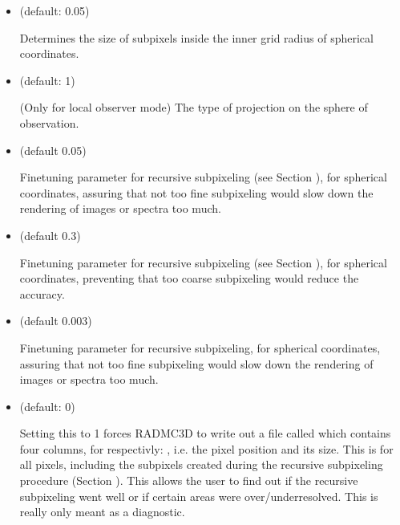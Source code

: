 \documentclass[letterpaper,10pt,english]{sphinxmanual}
\begin{document}
\begin{itemize}
\item {} 
 (default: 0.05) 

Determines the size of sub\sphinxhyphen{}pixels inside the inner grid radius of
spherical coordinates.

\item {} 
 (default: 1)

(Only for local observer mode) The type of projection on the sphere of
observation.

\item {} 
 (default 0.05) 

Fine\sphinxhyphen{}tuning parameter for recursive subpixeling (see Section
{\hyperref[\detokenize{imagesspectra:sec-recursive-subpixeling}]{}}), for spherical coordinates,
assuring that not too fine subpixeling would slow down the rendering of
images or spectra too much.

\item {} 
 (default 0.3) 

Fine\sphinxhyphen{}tuning parameter for recursive subpixeling (see Section
{\hyperref[\detokenize{imagesspectra:sec-recursive-subpixeling}]{}}), for spherical coordinates,
preventing that too coarse subpixeling would reduce the accuracy.

\item {} 
 (default 0.003) 

Fine\sphinxhyphen{}tuning parameter for recursive subpixeling, for spherical coordinates,
assuring that not too fine subpixeling would slow down the rendering of
images or spectra too much.

\item {} 
 (default: 0)

Setting this to 1 forces RADMC\sphinxhyphen{}3D to write out a file called
 which contains four columns, for respectivly:
, i.e. the pixel position and its size. This is for all
pixels, including the sub\sphinxhyphen{}pixels created during the recursive subpixeling
procedure (Section {\hyperref[\detokenize{imagesspectra:sec-recursive-subpixeling}]{}}). This allows the user to
find out if the recursive subpixeling went well or if certain areas were
over/under\sphinxhyphen{}resolved. This is really only meant as a diagnostic.


\end{itemize}
\end{document}

